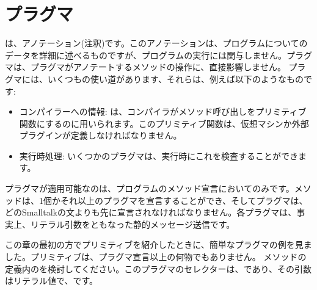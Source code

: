 \documentclass[a4paper,10pt,twoside]{book}
\begin{document}
\section{プラグマ}

は、アノテーション(注釈)です。このアノテーションは、プログラムについてのデータを詳細に述べるものですが、プログラムの実行には関与しません。プラグマは、プラグマがアノテートするメソッドの操作に、直接影響しません。
プラグマには、いくつもの使い道があります、それらは、例えば以下のようなものです:
\begin{itemize}
\item コンパイラーへの情報: は、コンパイラがメソッド呼び出しをプリミティブ関数にするのに用いられます。このプリミティブ関数は、仮想マシンか外部プラグインが定義しなければなりません。
\item 実行時処理: いくつかのプラグマは、実行時にこれを検査することができます。%
\end{itemize}

プラグマが適用可能なのは、プログラムのメソッド宣言においてのみです。メソッドは、1個かそれ以上のプラグマを宣言することができ、そしてプラグマは、どのSmalltalkの文よりも先に宣言されなければなりません。各プラグマは、事実上、リテラル引数をともなった静的メッセージ送信です。

この章の最初の方でプリミティブを紹介したときに、簡単なプラグマの例を見ました。プリミティブは、プラグマ宣言以上の何物でもありません。 
メソッドの定義内のを検討してください。このプラグマのセレクターは、であり、その引数はリテラル値で、です。%
\end{document}
